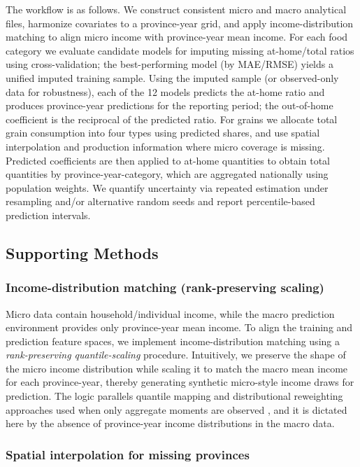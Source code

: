 \documentclass[12pt,a4paper]{article}
\begin{document}
The workflow is as follows. We construct consistent micro and macro analytical files, harmonize covariates to a province-year grid, and apply income-distribution matching to align micro income with province-year mean income. For each food category we evaluate candidate models for imputing missing at-home/total ratios using cross-validation; the best-performing model (by MAE/RMSE) yields a unified imputed training sample. Using the imputed sample (or observed-only data for robustness), each of the 12 models predicts the at-home ratio and produces province-year predictions for the reporting period; the out-of-home coefficient is the reciprocal of the predicted ratio. For grains we allocate total grain consumption into four types using predicted shares, and use spatial interpolation and production information where micro coverage is missing. Predicted coefficients are then applied to at-home quantities to obtain total quantities by province-year-category, which are aggregated nationally using population weights. We quantify uncertainty via repeated estimation under resampling and/or alternative random seeds and report percentile-based prediction intervals.

\subsection{Supporting Methods}

\subsubsection{Income-distribution matching (rank-preserving scaling)}
\label{sec:copula}

Micro data contain household/individual income, while the macro prediction environment provides only province-year mean income. To align the training and prediction feature spaces, we implement income-distribution matching using a \emph{rank-preserving quantile-scaling} procedure. Intuitively, we preserve the shape of the micro income distribution while scaling it to match the macro mean income for each province-year, thereby generating synthetic micro-style income draws for prediction. The logic parallels quantile mapping and distributional reweighting approaches used when only aggregate moments are observed \citep{Koenker2005, DiNardo1996}, and it is dictated here by the absence of province-year income distributions in the macro data.

\subsubsection{Spatial interpolation for missing provinces}
\end{document}
